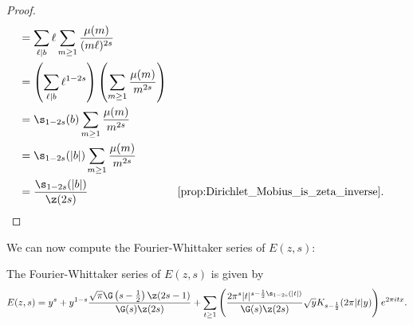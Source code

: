\begin{proof}
\begin{align*}
          &= \sum_{\ell \mid b}\ell\sum_{m \ge 1}\frac{\mu(m)}{(m\ell)^{2s}} \\
          &= \left(\sum_{\ell \mid b}\ell^{1-2s}\right)\left(\sum_{m \ge 1}\frac{\mu(m)}{m^{2s}}\right) \\
          &= \s_{1-2s}(b)\sum_{m \ge 1}\frac{\mu(m)}{m^{2s}} \\
          &= \s_{1-2s}(|b|)\sum_{m \ge 1}\frac{\mu(m)}{m^{2s}} \\
          &= \frac{\s_{1-2s}(|b|)}{\z(2s)} && \text{\cref{prop:Dirichlet_Mobius_is_zeta_inverse}}.
        \end{align*}
      \end{proof}

      We can now compute the Fourier-Whittaker series of $E(z,s)$:

      \begin{proposition}\label{prop:Fourier_coefficients_of_real-analytic_Eisenstein_series}
        The Fourier-Whittaker series of $E(z,s)$ is given by
        \[
          E(z,s) = y^{s}+y^{1-s}\frac{\sqrt{\pi}\G\left(s-\frac{1}{2}\right)\z(2s-1)}{\G(s)\z(2s)}+\sum_{t \ge 1}\left(\frac{2\pi^{s}|t|^{s-\frac{1}{2}\s_{1-2s}(|t|)}}{\G(s)\z(2s)}\sqrt{y}K_{s-\frac{1}{2}}(2\pi|t|y)\right)e^{2\pi itx}.
        \]
      \end{proposition}
